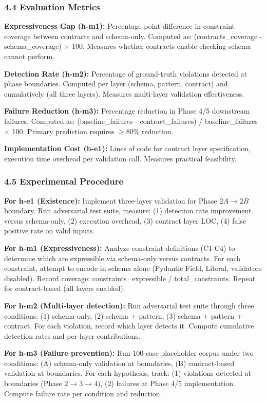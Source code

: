 \subsubsection{4.4 Evaluation Metrics}

\textbf{Expressiveness Gap (h-m1):} Percentage point difference in constraint coverage between contracts and schema-only. Computed as: (contracts\_coverage - schema\_coverage) $\times$ 100. Measures whether contracts enable checking schema cannot perform.

\textbf{Detection Rate (h-m2):} Percentage of ground-truth violations detected at phase boundaries. Computed per layer (schema, pattern, contract) and cumulatively (all three layers). Measures multi-layer validation effectiveness.

\textbf{Failure Reduction (h-m3):} Percentage reduction in Phase 4/5 downstream failures. Computed as: (baseline\_failures - contract\_failures) / baseline\_failures $\times$ 100. Primary prediction requires $\geq 80$\% reduction.

\textbf{Implementation Cost (h-e1):} Lines of code for contract layer specification, execution time overhead per validation call. Measures practical feasibility.

\subsubsection{4.5 Experimental Procedure}

\textbf{For h-e1 (Existence):} Implement three-layer validation for Phase $2A\rightarrow 2B$ boundary. Run adversarial test suite, measure: (1) detection rate improvement versus schema-only, (2) execution overhead, (3) contract layer LOC, (4) false positive rate on valid inputs.

\textbf{For h-m1 (Expressiveness):} Analyze constraint definitions (C1-C4) to determine which are expressible via schema-only versus contracts. For each constraint, attempt to encode in schema alone (Pydantic Field, Literal, validators disabled). Record coverage: constraints\_expressible / total\_constraints. Repeat for contract-based (all layers enabled).

\textbf{For h-m2 (Multi-layer detection):} Run adversarial test suite through three conditions: (1) schema-only, (2) schema + pattern, (3) schema + pattern + contract. For each violation, record which layer detects it. Compute cumulative detection rates and per-layer contributions.

\textbf{For h-m3 (Failure prevention):} Run 100-case placeholder corpus under two conditions: (A) schema-only validation at boundaries, (B) contract-based validation at boundaries. For each hypothesis, track: (1) violations detected at boundaries (Phase $2\rightarrow 3\rightarrow 4)$, (2) failures at Phase 4/5 implementation. Compute failure rate per condition and reduction.

